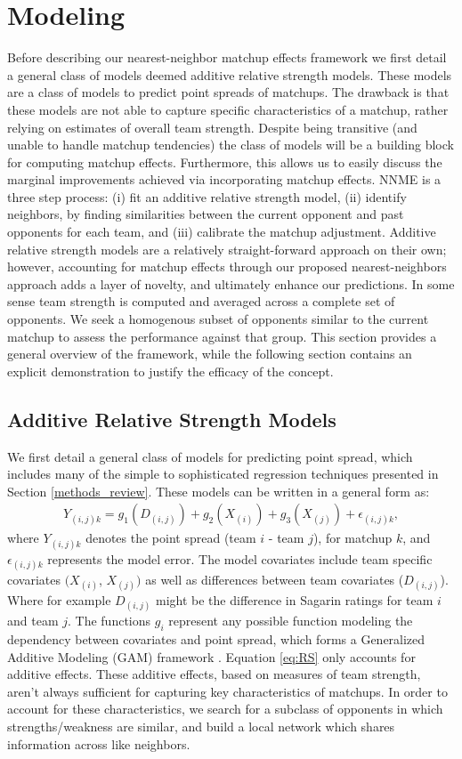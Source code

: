 \documentclass[letterpaper,12pt]{article}
\begin{document}
\section{Modeling\label{sec:NNME}}
Before describing our nearest-neighbor matchup effects framework we first detail a general class of models deemed additive relative strength models. These models are a class of models to predict point spreads of matchups. The drawback is that these models are not able to capture specific characteristics of a matchup, rather relying on estimates of overall team strength. Despite being transitive (and unable to handle matchup tendencies) the class of models will be a building block for computing matchup effects. Furthermore, this allows us to easily discuss the marginal improvements achieved via incorporating matchup effects. NNME is a three step process: (i) fit an additive relative strength model, (ii) identify neighbors, by finding similarities between the current opponent and past opponents for each team, and (iii) calibrate the matchup adjustment. Additive relative strength models are a relatively straight-forward approach on their own; however, accounting for matchup effects through our proposed nearest-neighbors approach adds a layer of novelty, and ultimately enhance our predictions. In some sense team strength is computed and averaged across a complete set of opponents. We seek a homogenous subset of opponents similar to the current matchup to assess the performance against that group. This section provides a general overview of the framework, while the following section contains an explicit demonstration to justify the efficacy of the concept.

\subsection{Additive Relative Strength Models}
We first detail a general class of models for predicting point spread, which includes many of the simple to sophisticated regression techniques presented in Section \ref{methods_review}. These models can be written in a general form as:
\begin{eqnarray}
Y_{(i,j)k} = g_1(D_{(i,j)}) + g_2(X_{(i)}) + g_3(X_{(j)}) +  \epsilon_{(i,j)k},
\label{eq:RS}
\end{eqnarray}
where $Y_{(i,j)k}$ denotes the point spread (team $i$ - team $j$), for matchup $k$, and $\epsilon_{(i,j)k}$ represents the model error. The model covariates include team specific covariates $(X_{(i)}$, $X_{(j)})$ as well as differences between team covariates ($D_{(i,j)}$). Where for example $D_{(i,j)}$ might be the difference in Sagarin ratings for team $i$ and team $j$. The functions $g_i$ represent any possible function modeling the dependency between covariates and point spread, which forms a Generalized Additive Modeling (GAM) framework \citep{GAMs}. Equation \ref{eq:RS} only accounts for additive effects. These additive effects, based on measures of team strength, aren't always sufficient for capturing key characteristics of matchups. In order to account for these characteristics, we search for a subclass of opponents in which strengths/weakness are similar, and build a local network which shares information across like neighbors.  
\end{document}
